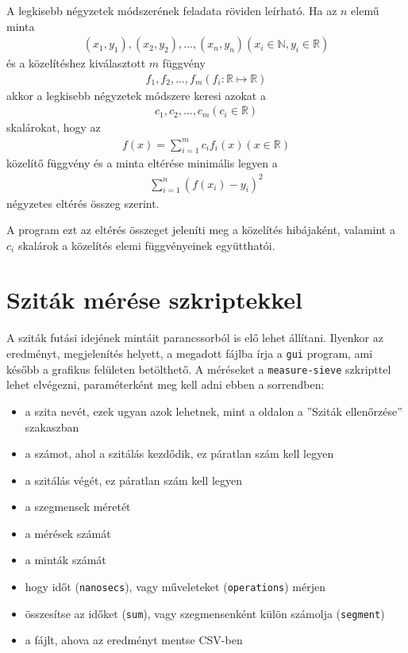 A legkisebb négyzetek módszerének feladata röviden leírható.
Ha az $n$ elemű minta
\begin{align*}
(x_1, y_1), (x_2, y_2), \ldots, (x_n, y_n) (x_i \in \mathbb{N}, y_i \in \mathbb{R})
\end{align*}
és a közelítéshez kiválasztott $m$ függvény
\begin{align*}
f_1, f_2, ..., f_m (f_i:\mathbb{R} \mapsto \mathbb{R})
\end{align*}
akkor a legkisebb négyzetek módszere keresi azokat a
\begin{align*}
c_1, c_2, ..., c_m (c_i \in \mathbb{R})
\end{align*}
skalárokat, hogy az
\begin{align*}
f(x)=\sum_{i=1}^m c_i f_i(x) (x \in \mathbb{R})
\end{align*}
közelítő függvény és a minta eltérése minimális
legyen a
\begin{align*}
\sum_{i=1}^{n} (f(x_i)-y_i)^2
\end{align*}
négyzetes eltérés összeg szerint.

A program ezt az eltérés összeget jeleníti meg a közelítés hibájaként, valamint a $c_i$ skalárok a közelítés elemi függvényeinek együtthatói.

\section{Sziták mérése szkriptekkel}

A sziták futási idejének mintáit parancssorból is elő lehet állítani.
Ilyenkor az eredményt, megjelenítés helyett, a megadott fájlba írja a \texttt{gui} program, ami később a grafikus felületen betölthető.
A méréseket a \texttt{measure-sieve} szkripttel lehet elvégezni, paraméterként meg kell adni ebben a sorrendben:
\begin{itemize}
\item a szita nevét, ezek ugyan azok lehetnek, mint a \pageref{sec:szitak-ellenorzese} oldalon a ''Sziták ellenőrzése'' szakaszban
\item a számot, ahol a szitálás kezdődik, ez páratlan szám kell legyen
\item a szitálás végét, ez páratlan szám kell legyen
\item a szegmensek méretét
\item a mérések számát
\item a minták számát
\item hogy időt (\texttt{nanosecs}), vagy műveleteket (\texttt{operations}) mérjen
\item összesítse az időket (\texttt{sum}), vagy szegmensenként külön számolja (\texttt{segment})
\item a fájlt, ahova az eredményt mentse CSV-ben
\end{itemize}

